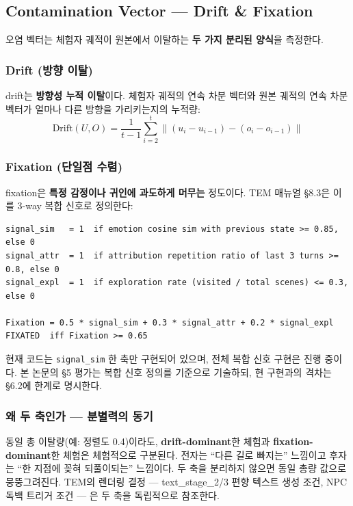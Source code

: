 \documentclass[11pt, a4paper]{article}
\begin{document}
\subsection{Contamination Vector --- Drift \& Fixation}

오염 벡터는 체험자 궤적이 원본에서 이탈하는 \textbf{두 가지 분리된 양식}을 측정한다.

\subsubsection{Drift (방향 이탈)}
drift는 \textbf{방향성 누적 이탈}이다. 체험자 궤적의 연속 차분 벡터와 원본 궤적의 연속 차분 벡터가 얼마나 다른 방향을 가리키는지의 누적량:
\begin{equation}
\text{Drift}(U, O) = \frac{1}{t-1} \sum_{i=2}^{t} \left\| (u_i - u_{i-1}) - (o_i - o_{i-1}) \right\|
\end{equation}

\subsubsection{Fixation (단일점 수렴)}
fixation은 \textbf{특정 감정이나 귀인에 과도하게 머무는} 정도이다. TEM 매뉴얼 §8.3은 이를 3-way 복합 신호로 정의한다:
\begin{lstlisting}
signal_sim   = 1  if emotion cosine sim with previous state >= 0.85, else 0
signal_attr  = 1  if attribution repetition ratio of last 3 turns >= 0.8, else 0
signal_expl  = 1  if exploration rate (visited / total scenes) <= 0.3, else 0

Fixation = 0.5 * signal_sim + 0.3 * signal_attr + 0.2 * signal_expl
FIXATED  iff Fixation >= 0.65
\end{lstlisting}
현재 코드는 \texttt{signal\_sim} 한 축만 구현되어 있으며, 전체 복합 신호 구현은 진행 중이다. 본 논문의 \S5 평가는 복합 신호 정의를 기준으로 기술하되, 현 구현과의 격차는 \S6.2에 한계로 명시한다.

\subsubsection{왜 두 축인가 --- 분별력의 동기}
동일 총 이탈량(예: 정렬도 0.4)이라도, \textbf{drift-dominant}한 체험과 \textbf{fixation-dominant}한 체험은 체험적으로 구분된다. 전자는 ``다른 길로 빠지는'' 느낌이고 후자는 ``한 지점에 꽂혀 되풀이되는'' 느낌이다. 두 축을 분리하지 않으면 동일 총량 값으로 뭉뚱그려진다. TEM의 렌더링 결정 --- text\_stage\_2/3 편향 텍스트 생성 조건, NPC 독백 트리거 조건 --- 은 두 축을 독립적으로 참조한다.
\end{document}
